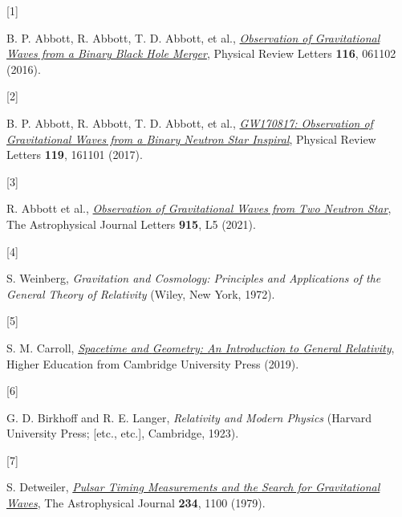 \documentclass[
  10pt,
  a4paper,
  DIV=11,
  numbers=noendperiod,
  oneside]{scrreprt}
\newlength{\cslhangindent}
\newlength{\csllabelwidth}
\newlength{\cslentryspacingunit} %
\newenvironment{CSLReferences}[2] %
 {%
  \setlength{\parindent}{0pt}
  \ifodd #1
  \let\oldpar\par
  \def\par{\hangindent=\cslhangindent\oldpar}
  \fi
  \setlength{\parskip}{#2\cslentryspacingunit}
 }%
 {}
\newcommand{\CSLLeftMargin}[1]{\parbox[t]{\csllabelwidth}{#1}}
\newcommand{\CSLRightInline}[1]{\parbox[t]{\linewidth - \csllabelwidth}{#1}\break}
\DeclareRobustCommand{\[}{\begin{equation}}
\DeclareRobustCommand{\]}{\end{equation}}
\begin{document}
\hypertarget{refs}{}
\begin{CSLReferences}{0}{0}
\begin{figure}

\end{figure}

\leavevmode{}%
\CSLLeftMargin{{[}1{]} }%
\CSLRightInline{B. P. Abbott, R. Abbott, T. D. Abbott, et al.,
\emph{\href{https://doi.org/10.1103/PhysRevLett.116.061102}{Observation
of {Gravitational Waves} from a {Binary Black Hole Merger}}}, Physical
Review Letters \textbf{116}, 061102 (2016).}

\leavevmode{}%
\CSLLeftMargin{{[}2{]} }%
\CSLRightInline{B. P. Abbott, R. Abbott, T. D. Abbott, et al.,
\emph{\href{https://doi.org/10.1103/PhysRevLett.119.161101}{{GW170817}:
{Observation} of {Gravitational Waves} from a {Binary Neutron Star
Inspiral}}}, Physical Review Letters \textbf{119}, 161101 (2017).}

\leavevmode{}%
\CSLLeftMargin{{[}3{]} }%
\CSLRightInline{R. Abbott et al.,
\emph{\href{https://doi.org/10.3847/2041-8213/ac082e}{Observation of
{Gravitational Waves} from {Two Neutron
Star}\textendash{{Black Hole Coalescences}}}}, The Astrophysical Journal
Letters \textbf{915}, L5 (2021).}

\leavevmode{}%
\CSLLeftMargin{{[}4{]} }%
\CSLRightInline{S. Weinberg, \emph{Gravitation and Cosmology: Principles
and Applications of the General Theory of Relativity} ({Wiley}, {New
York}, 1972).}

\leavevmode{}%
\CSLLeftMargin{{[}5{]} }%
\CSLRightInline{S. M. Carroll,
\emph{\href{https://doi.org/10.1017/9781108770385}{Spacetime and
{Geometry}: {An Introduction} to {General Relativity}}}, Higher
Education from Cambridge University Press (2019).}

\leavevmode{}%
\CSLLeftMargin{{[}6{]} }%
\CSLRightInline{G. D. Birkhoff and R. E. Langer, \emph{Relativity and
Modern Physics} ({Harvard University Press; {[}etc., etc.{]}},
{Cambridge}, 1923).}

\leavevmode{}%
\CSLLeftMargin{{[}7{]} }%
\CSLRightInline{S. Detweiler,
\emph{\href{https://doi.org/10.1086/157593}{Pulsar Timing Measurements
and the Search for Gravitational Waves}}, The Astrophysical Journal
\textbf{234}, 1100 (1979).}


\end{CSLReferences}
\end{document}
